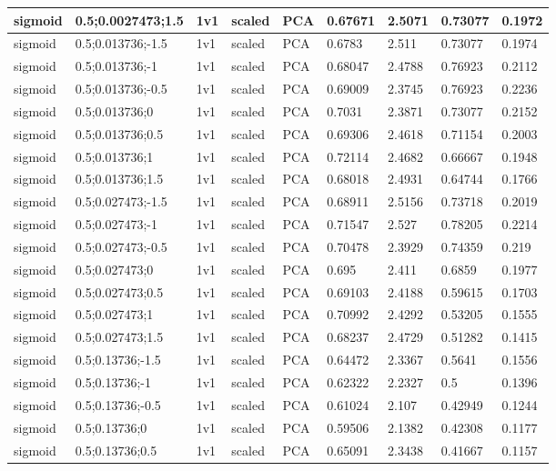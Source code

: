 \begin{longtable}{lllllllll}
sigmoid & 0.5;0.0027473;1.5 & 1v1 & scaled & PCA & 0.67671 & 2.5071 & 0.73077 & 0.1972\\ \hline
sigmoid & 0.5;0.013736;-1.5 & 1v1 & scaled & PCA & 0.6783 & 2.511 & 0.73077 & 0.1974\\ \hline
sigmoid & 0.5;0.013736;-1 & 1v1 & scaled & PCA & 0.68047 & 2.4788 & 0.76923 & 0.2112\\ \hline
sigmoid & 0.5;0.013736;-0.5 & 1v1 & scaled & PCA & 0.69009 & 2.3745 & 0.76923 & 0.2236\\ \hline
sigmoid & 0.5;0.013736;0 & 1v1 & scaled & PCA & 0.7031 & 2.3871 & 0.73077 & 0.2152\\ \hline
sigmoid & 0.5;0.013736;0.5 & 1v1 & scaled & PCA & 0.69306 & 2.4618 & 0.71154 & 0.2003\\ \hline
sigmoid & 0.5;0.013736;1 & 1v1 & scaled & PCA & 0.72114 & 2.4682 & 0.66667 & 0.1948\\ \hline
sigmoid & 0.5;0.013736;1.5 & 1v1 & scaled & PCA & 0.68018 & 2.4931 & 0.64744 & 0.1766\\ \hline
sigmoid & 0.5;0.027473;-1.5 & 1v1 & scaled & PCA & 0.68911 & 2.5156 & 0.73718 & 0.2019\\ \hline
sigmoid & 0.5;0.027473;-1 & 1v1 & scaled & PCA & 0.71547 & 2.527 & 0.78205 & 0.2214\\ \hline
sigmoid & 0.5;0.027473;-0.5 & 1v1 & scaled & PCA & 0.70478 & 2.3929 & 0.74359 & 0.219\\ \hline
sigmoid & 0.5;0.027473;0 & 1v1 & scaled & PCA & 0.695 & 2.411 & 0.6859 & 0.1977\\ \hline
sigmoid & 0.5;0.027473;0.5 & 1v1 & scaled & PCA & 0.69103 & 2.4188 & 0.59615 & 0.1703\\ \hline
sigmoid & 0.5;0.027473;1 & 1v1 & scaled & PCA & 0.70992 & 2.4292 & 0.53205 & 0.1555\\ \hline
sigmoid & 0.5;0.027473;1.5 & 1v1 & scaled & PCA & 0.68237 & 2.4729 & 0.51282 & 0.1415\\ \hline
sigmoid & 0.5;0.13736;-1.5 & 1v1 & scaled & PCA & 0.64472 & 2.3367 & 0.5641 & 0.1556\\ \hline
sigmoid & 0.5;0.13736;-1 & 1v1 & scaled & PCA & 0.62322 & 2.2327 & 0.5 & 0.1396\\ \hline
sigmoid & 0.5;0.13736;-0.5 & 1v1 & scaled & PCA & 0.61024 & 2.107 & 0.42949 & 0.1244\\ \hline
sigmoid & 0.5;0.13736;0 & 1v1 & scaled & PCA & 0.59506 & 2.1382 & 0.42308 & 0.1177\\ \hline
sigmoid & 0.5;0.13736;0.5 & 1v1 & scaled & PCA & 0.65091 & 2.3438 & 0.41667 & 0.1157\\ \hline

\end{longtable}
